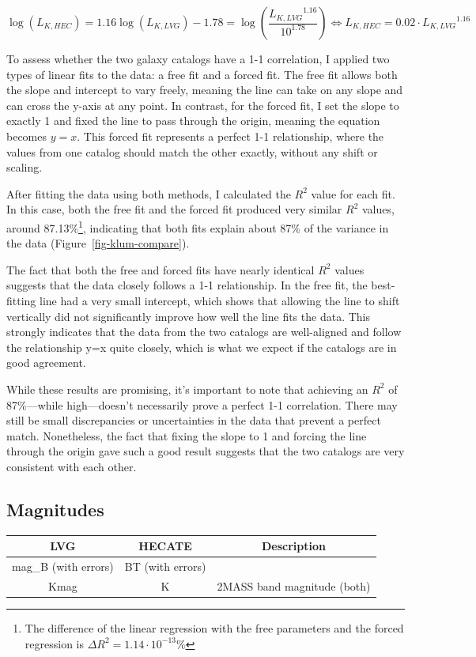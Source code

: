 \documentclass[
]{article}
\begin{document}
\[
\log(L_{K,HEC})=1.16\log(L_{K,LVG})-1.78=\log\left(\frac{{L_{K,LVG}}^{1.16}}{10^{1.78}}\right) \Leftrightarrow L_{K,HEC}=0.02\cdot{L_{K,LVG}}^{1.16}
\]

To assess whether the two galaxy catalogs have a 1-1 correlation, I
applied two types of linear fits to the data: a free fit and a forced
fit. The free fit allows both the slope and intercept to vary freely,
meaning the line can take on any slope and can cross the y-axis at any
point. In contrast, for the forced fit, I set the slope to exactly 1 and
fixed the line to pass through the origin, meaning the equation becomes
\(y=x\). This forced fit represents a perfect 1-1 relationship, where
the values from one catalog should match the other exactly, without any
shift or scaling.

After fitting the data using both methods, I calculated the \(R^2\)
value for each fit. In this case, both the free fit and the forced fit
produced very similar \(R^2\) values, around 87.13\%\footnote{The
  difference of the linear regression with the free parameters and the
  forced regression is \(\Delta R^2 = 1.14\cdot 10^{-13}\%\)},
indicating that both fits explain about 87\% of the variance in the data
(Figure~\ref{fig-klum-compare}).

The fact that both the free and forced fits have nearly identical
\(R^2\) values suggests that the data closely follows a 1-1
relationship. In the free fit, the best-fitting line had a very small
intercept, which shows that allowing the line to shift vertically did
not significantly improve how well the line fits the data. This strongly
indicates that the data from the two catalogs are well-aligned and
follow the relationship y=x quite closely, which is what we expect if
the catalogs are in good agreement.

While these results are promising, it's important to note that achieving
an \(R^2\) of 87\%---while high---doesn't necessarily prove a perfect
1-1 correlation. There may still be small discrepancies or uncertainties
in the data that prevent a perfect match. Nonetheless, the fact that
fixing the slope to 1 and forcing the line through the origin gave such
a good result suggests that the two catalogs are very consistent with
each other.

\subsection{Magnitudes}\label{magnitudes}

\begin{longtable}[]{@{}ccc@{}}
\toprule\noalign{}
LVG & HECATE & Description \\
\midrule\noalign{}
\endhead
\bottomrule\noalign{}
\endlastfoot
mag\_B (with errors) & BT (with errors) & \\
Kmag & K & 2MASS band magnitude (both) \\
\end{longtable}
\end{document}
